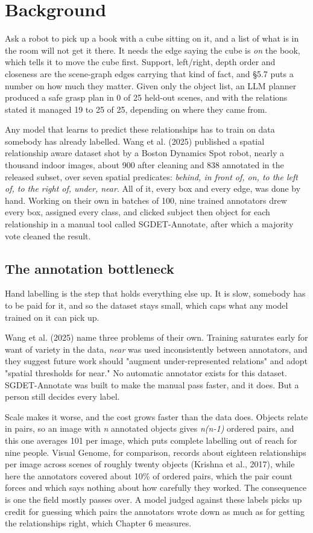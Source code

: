 
\section{Background}

Ask a robot to pick up a book with a cube sitting on it, and a list of what is in the room will not get it there. It needs the edge saying the cube is \textit{on} the book, which tells it to move the cube first. Support, left/right, depth order and closeness are the scene-graph edges carrying that kind of fact, and \S{}5.7 puts a number on how much they matter. Given only the object list, an LLM planner produced a safe grasp plan in 0 of 25 held-out scenes, and with the relations stated it managed 19 to 25 of 25, depending on where they came from.

Any model that learns to predict these relationships has to train on data somebody has already labelled. Wang et al. (2025) published a spatial relationship aware dataset shot by a Boston Dynamics Spot robot, nearly a thousand indoor images, about 900 after cleaning and 838 annotated in the released subset, over seven spatial predicates: \textit{behind, in front of, on, to the left of, to the right of, under, near}. All of it, every box and every edge, was done by hand. Working on their own in batches of 100, nine trained annotators drew every box, assigned every class, and clicked subject then object for each relationship in a manual tool called SGDET-Annotate, after which a majority vote cleaned the result.

\subsection{The annotation bottleneck}

Hand labelling is the step that holds everything else up. It is slow, somebody has to be paid for it, and so the dataset stays small, which caps what any model trained on it can pick up.

Wang et al. (2025) name three problems of their own. Training saturates early for want of variety in the data, \textit{near} was used inconsistently between annotators, and they suggest future work should "augment under-represented relations" and adopt "spatial thresholds for near." No automatic annotator exists for this dataset. SGDET-Annotate was built to make the manual pass faster, and it does. But a person still decides every label.

Scale makes it worse, and the cost grows faster than the data does. Objects relate in pairs, so an image with \textit{n} annotated objects gives \textit{n(n-1)} ordered pairs, and this one averages 101 per image, which puts complete labelling out of reach for nine people. Visual Genome, for comparison, records about eighteen relationships per image across scenes of roughly twenty objects (Krishna et al., 2017), while here the annotators covered about 10\% of ordered pairs, which the pair count forces and which says nothing about how carefully they worked. The consequence is one the field mostly passes over. A model judged against these labels picks up credit for guessing which pairs the annotators wrote down as much as for getting the relationships right, which Chapter 6 measures.

